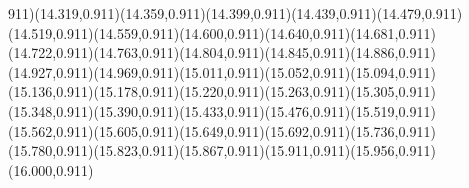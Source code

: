 \documentclass[smallextended]{svjour3}
\begin{document}
911)(14.319,0.911)(14.359,0.911)(14.399,0.911)(14.439,0.911)(14.479,0.911)(14.519,0.911)(14.559,0.911)(14.600,0.911)(14.640,0.911)(14.681,0.911)(14.722,0.911)(14.763,0.911)(14.804,0.911)(14.845,0.911)(14.886,0.911)(14.927,0.911)(14.969,0.911)(15.011,0.911)(15.052,0.911)(15.094,0.911)(15.136,0.911)(15.178,0.911)(15.220,0.911)(15.263,0.911)(15.305,0.911)(15.348,0.911)(15.390,0.911)(15.433,0.911)(15.476,0.911)(15.519,0.911)(15.562,0.911)(15.605,0.911)(15.649,0.911)(15.692,0.911)(15.736,0.911)(15.780,0.911)(15.823,0.911)(15.867,0.911)(15.911,0.911)(15.956,0.911)(16.000,0.911)

\end{document}
